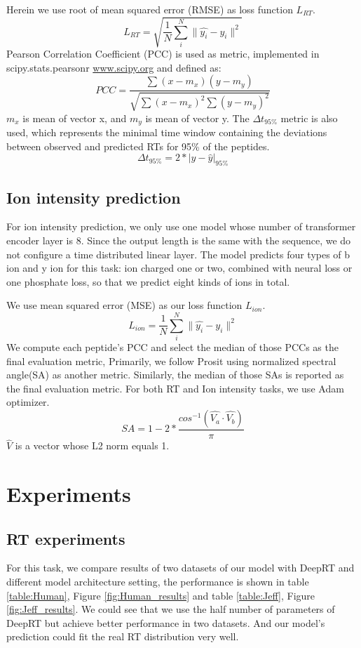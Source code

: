 \documentclass[final]{cvpr}
\begin{document}
Herein we use root of mean squared error (RMSE) as loss function \( L_{RT} \).
\[ L_{RT} = \sqrt{\frac{1}{N}\sum_{i}^N\|\hat{y_{i}} - y_{i}\|^2} \]
Pearson Correlation Coefficient (PCC) is used as metric, implemented in scipy.stats.pearsonr 
\url{www.scipy.org} and defined as:
\[ PCC = \frac{\sum{(x-m_{x})(y-m_{y})}}{\sqrt{\sum{(x-m_{x})^2\sum{(y-m_{y})^2}}}}\]
$m_{x}$ is mean of vector x, and $m_{y}$ is mean of vector y.
The $\Delta$$t_{95\%}$ metric is also used, which represents 
the minimal time window containing the deviations between observed and predicted RTs for 95\% of 
the peptides. 
\[ \Delta t_{95\%} = 2 * | y - \hat{y} |_{95\%} \]

\subsection{Ion intensity prediction}

For ion intensity prediction, we only use one model whose number of transformer encoder layer is 8. Since the output length is 
the same with the sequence, we do not configure a time distributed linear layer.
The model predicts four types of b ion and y ion for this task: ion charged one or two, combined with neural loss or one phosphate loss,
so that we predict eight kinds of ions in total. 

We use mean squared 
error (MSE) as our loss function \( L_{ion} \).
\[ L_{ion} = \frac{1}{N}\sum_{i}^N\|\hat{y_{i}} - y_{i}\|^2 \]
We compute each peptide's PCC and select the median of those PCCs as the final evaluation metric, 
Primarily, we follow Prosit\cite{gessulat2019prosit} using normalized 
spectral angle(SA) as another metric. Similarly, the median of those SAs is reported as the final evaluation metric.
For both RT and Ion intensity tasks, we use Adam optimizer.  
\[ SA = 1 - 2 * \frac{cos^{-1}(\hat{V_a}\cdot\hat{V_b})}{\pi} \]
$\hat{V}$ is a vector whose L2 norm equals 1.
\section{Experiments}
\subsection{RT experiments}
For this task, we compare results of two datasets of our model with DeepRT and different model architecture setting, the performance
is shown in table \ref{table:Human}, Figure \ref{fig:Human_results} and table \ref{table:Jeff}, Figure \ref{fig:Jeff_results}. We could see that we use the 
half number of parameters of DeepRT but achieve better performance in two datasets. And our model's prediction could
fit the real RT distribution very well.
\end{document}
